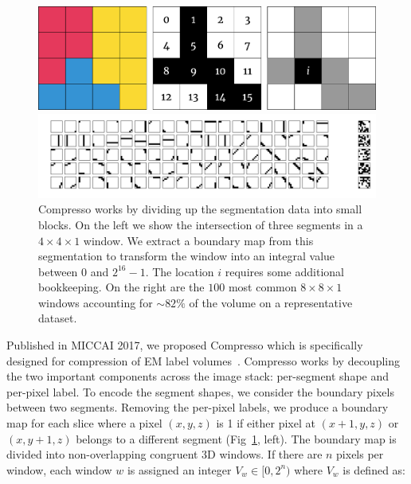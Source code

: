 \begin{figure}[t]
	\begin{center}
		\begin{minipage}{0.45\linewidth}
			\centering
			\includegraphics[width=\linewidth]{./figures/encoding_diagram_opt.pdf}
		\end{minipage}
		\hspace{0.08\linewidth}
		\begin{minipage}{0.45\linewidth}
			\centering
			\includegraphics[width=\linewidth]{./figures/window_values.pdf}
		\end{minipage}
	\end{center}	
	\caption{Compresso works by dividing up the segmentation data into small blocks. On the left we show the intersection of three segments in a $4\times4\times1$ window. We extract a boundary map from this segmentation to transform the window into an integral value between $0$ and $2^{16} - 1$. The location $i$ requires some additional bookkeeping. On the right are the $100$ most common $8 \times 8 \times 1$ windows accounting for $\sim82\%$ of the volume on a representative dataset.}
	\label{fig:compression}
\end{figure}


Published in MICCAI 2017, we proposed Compresso which is specifically designed for compression of EM label volumes~\cite{matejek2017compresso}.
Compresso works by decoupling the two important components across the image stack: per-segment shape and per-pixel label.
To encode the segment shapes, we consider the boundary pixels between two segments. 
Removing the per-pixel labels, we produce a boundary map for each slice where a pixel $(x, y, z)$ is 1 if either pixel at $(x + 1, y, z)$ or $(x, y + 1, z)$ belongs to a different segment (Fig~\ref{fig:compression}, left). 
The boundary map is divided into non-overlapping congruent 3D windows. If there are $n$ pixels per window, each window $w$ is assigned an integer $V_w \in [0, 2^n)$ where $V_w$ is defined as:

